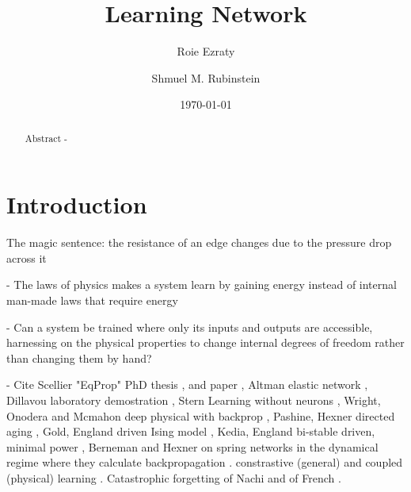 \documentclass[%
 reprint,
 amsmath,amssymb,
 aps,
]{revtex4-2}
\begin{document}

\title{Learning Network}

\author{Roie Ezraty}
\author{Shmuel M. Rubinstein}%

\date{\today}%

\maketitle

\begin{abstract}

Abstract - 

\end{abstract}

\section{Introduction}\label{sec:Introduction}

    The magic sentence: the resistance of an edge changes due to the pressure drop across it

    - The laws of physics makes a system learn by gaining energy instead of internal man-made laws that require energy

    - Can a system be trained where only its inputs and outputs are accessible, harnessing on the physical properties to change internal degrees of freedom rather than changing them by hand?

    - Cite Scellier "EqProp" PhD thesis \cite{scellier2021deeplearningtheoryneural}, and paper \cite{scellier2017equilibrium}, Altman elastic network \cite{altman2024experimental}, Dillavou laboratory demostration \cite{dillavou2022demonstration}, Stern Learning without neurons \cite{stern2023learning}, Wright, Onodera and Mcmahon deep physical with backprop \cite{wright2022deep}, Pashine, Hexner directed aging \cite{pashine2019directed}, Gold, England driven Ising model \cite{gold2019self}, Kedia, England bi-stable driven, minimal power \cite{kedia2019drive}, Berneman and Hexner on spring networks in the dynamical regime where they calculate backpropagation \cite{berneman2024designing}. constrastive (general) and coupled (physical) learning \cite{stern2021supervised}. Catastrophic forgetting of Nachi \cite{stern2020continual} and of French \cite{FRENCH1999128}. 
\end{document}
